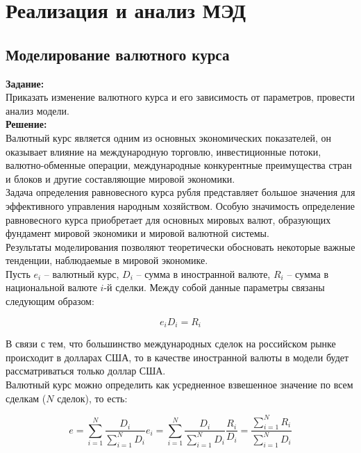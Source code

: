 \section*{Реализация и анализ МЭД}
\subsection*{Моделирование валютного курса}

\textbf{Задание:}\\
Приказать изменение валютного курса и его зависимость от параметров, провести анализ модели.\\

\textbf{Решение:}\\
Валютный курс является одним из основных экономических показателей, он оказывает влияние на международную торговлю, инвестиционные потоки, валютно-обменные операции, международные конкурентные преимущества стран и блоков и другие составляющие мировой экономики.\\

Задача определения равновесного курса рубля представляет большое значения для эффективного управления народным хозяйством. Особую значимость определение равновесного курса приобретает для основных мировых валют, образующих фундамент мировой экономики и мировой валютной системы.\\

Результаты моделирования позволяют теоретически обосновать некоторые важные тенденции, наблюдаемые в мировой экономике.\\

Пусть $e_i$ -- валютный курс, $D_i$ -- сумма в иностранной валюте, $R_i$ -- сумма в национальной валюте $i$-й сделки. Между собой данные параметры связаны следующим образом:

\[e_i D_i = R_i\]

В связи с тем, что большинство международных сделок на российском рынке происходит в долларах США, то в качестве иностранной валюты в модели будет рассматриваться только доллар США.\\

Валютный курс можно определить как усредненное взвешенное значение по всем сделкам ($N$ сделок), то есть:

\[e = \sum_{i=1}^N \dfrac{D_i}{\sum_{i=1}^N D_i} e_i = \sum_{i=1}^N \dfrac{D_i}{\sum_{i=1}^N D_i} \dfrac{R_i}{D_i} = \dfrac{\sum_{i=1}^N R_i}{\sum_{i=1}^N D_i} \]


